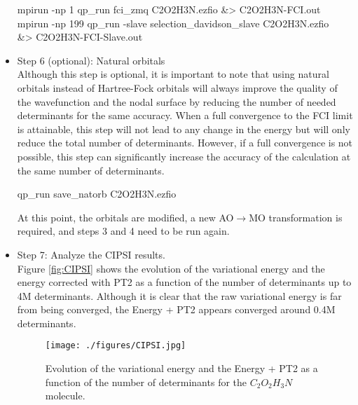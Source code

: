 \begin{itemize}
\begin{shade}
mpirun -np 1 qp_run fci_zmq C2O2H3N.ezfio &> C2O2H3N-FCI.out 
mpirun -np 199 qp_run -slave selection_davidson_slave C2O2H3N.ezfio\\
&> C2O2H3N-FCI-Slave.out 
\end{shade}

\item Step 6 (optional): Natural orbitals \\
Although this step is optional, it is important to note that using natural orbitals instead of Hartree-Fock orbitals will always improve the quality of the wavefunction and the nodal surface by reducing the number of needed determinants for the same accuracy. When a full convergence to the FCI limit is attainable, this step will not lead to any change in the energy but will only reduce the total number of determinants. However, if a full convergence is not possible, this step can significantly increase the accuracy of the calculation at the same number of determinants. 

\begin{shade}
qp_run save_natorb C2O2H3N.ezfio  
\end{shade}
\hfill
At this point, the orbitals are modified, a new AO$\rightarrow$MO transformation is required, and steps 3 and 4 need to be run again.

\item Step 7: Analyze the CIPSI results.\\
Figure \ref{fig:CIPSI} shows the evolution of the variational energy and the energy corrected with PT2 as a function of the number of determinants up to 4M determinants. Although it is clear that the raw variational energy is far from being converged, the Energy + PT2 appears converged around 0.4M determinants.

\begin{figure}
\begin{center}
\texttt{[image: ./figures/CIPSI.jpg]}
\end{center}
\caption{Evolution of the variational energy and the Energy + PT2 as a function of the number of determinants for the $C_2O_2H_3N$ molecule.}
\protect{\label{fig:CIPSI}}
\end{figure}






\end{itemize}
